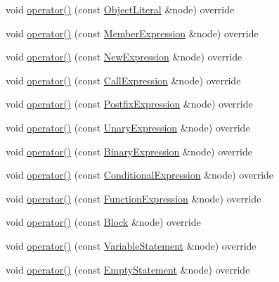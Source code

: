 \begin{DoxyCompactItemize}
\item 
void \hyperlink{struct_callable_visitor_ab3e67c6bb7d8332203e686d6aac59039}{operator()} (const \hyperlink{structast_1_1_object_literal}{Object\+Literal} \&node) override
\item 
void \hyperlink{struct_callable_visitor_a59d72c70fe06b87dfe5fdd9d53469ef2}{operator()} (const \hyperlink{structast_1_1_member_expression}{Member\+Expression} \&node) override
\item 
void \hyperlink{struct_callable_visitor_a2f9386232d6c45a5a15faf2a711895cd}{operator()} (const \hyperlink{structast_1_1_new_expression}{New\+Expression} \&node) override
\item 
void \hyperlink{struct_callable_visitor_a1cddd42d479e93e1a7e9693726e18dd5}{operator()} (const \hyperlink{structast_1_1_call_expression}{Call\+Expression} \&node) override
\item 
void \hyperlink{struct_callable_visitor_abc81c2b2a4765ac791bf6cd73ca97b9a}{operator()} (const \hyperlink{structast_1_1_postfix_expression}{Postfix\+Expression} \&node) override
\item 
void \hyperlink{struct_callable_visitor_a97c38a0a06a6f9ab527546060b518639}{operator()} (const \hyperlink{structast_1_1_unary_expression}{Unary\+Expression} \&node) override
\item 
void \hyperlink{struct_callable_visitor_ae926f418a357edc9dfebb0173b921029}{operator()} (const \hyperlink{structast_1_1_binary_expression}{Binary\+Expression} \&node) override
\item 
void \hyperlink{struct_callable_visitor_a239782df486cd64db0434955f114cb43}{operator()} (const \hyperlink{structast_1_1_conditional_expression}{Conditional\+Expression} \&node) override
\item 
void \hyperlink{struct_callable_visitor_ae27a0a08ee7eaa1956bd9e43da01ee4f}{operator()} (const \hyperlink{structast_1_1_function_expression}{Function\+Expression} \&node) override
\item 
void \hyperlink{struct_callable_visitor_a4ad3a74aae8cb9f1b4a8deb6d5738ccc}{operator()} (const \hyperlink{structast_1_1_block}{Block} \&node) override
\item 
void \hyperlink{struct_callable_visitor_a953a21e9aab73b9104355c2d04b3f79d}{operator()} (const \hyperlink{structast_1_1_variable_statement}{Variable\+Statement} \&node) override
\item 
void \hyperlink{struct_callable_visitor_a71422a8c5db1c1f6e73dd76638a2a47b}{operator()} (const \hyperlink{structast_1_1_empty_statement}{Empty\+Statement} \&node) override

\end{DoxyCompactItemize}
